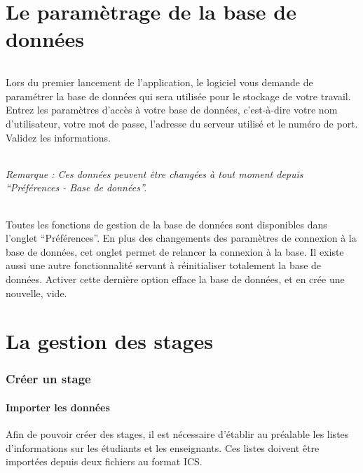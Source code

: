 \documentclass[a4paper,10pt]{book}
\begin{document}
\part{Le paramètrage de la base de données}
  \paragraph{}
    Lors du premier lancement de l'application, le logiciel vous demande de paramétrer la base de données qui sera utilisée pour le stockage de votre travail.
    Entrez les paramètres d'accès à votre base de données, c'est-à-dire votre nom d'utilisateur, votre mot de passe, l'adresse du serveur utilisé et le numéro de port.
    Validez les informations.
    
  \paragraph{}
      \textit{Remarque : Ces données peuvent être changées à tout moment depuis ``Préférences - Base de données''.}
  
  \paragraph{}
    Toutes les fonctions de gestion de la base de données sont disponibles dans l'onglet ``Préférences''.
    En plus des changements des paramètres de connexion à la base de données, cet onglet permet de relancer la connexion à la base.
    Il existe aussi une autre fonctionnalité servant à réinitialiser totalement la base de données.
    Activer cette dernière option efface la base de données, et en crée une nouvelle, vide.
  
\part{La gestion des stages}
    \section{Créer un stage} 
      
      \subsection{Importer les données}
      
	Afin de pouvoir créer des stages, il est nécessaire d'établir au préalable les listes d'informations sur les étudiants et les enseignants.
	Ces listes doivent être importées depuis deux fichiers au format ICS.
	
\end{document}
